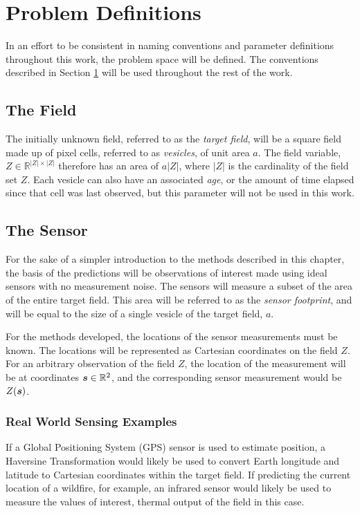 \chapter{Problem Definitions} \label{ch:defs}
In an effort to be consistent in naming conventions and parameter definitions throughout this work, the problem space will be defined. The conventions described in Section \ref{ch:defs} will be used throughout the rest of the work.

\section{The Field}
The initially unknown field, referred to as the \textit{target field}, will be a square field made up of pixel cells, referred to as \textit{vesicles}, of unit area $a$. The field variable, $Z \in \mathbb{R}^{|Z| \times |Z|}$ therefore has an area of $a|Z|$, where $|Z|$ is the cardinality of the field set $Z$. Each vesicle can also have an associated \textit{age}, or the amount of time elapsed since that cell was last observed, but this parameter will not be used in this work.

\section{The Sensor}
For the sake of a simpler introduction to the methods described in this chapter, the basis of the predictions will be observations of interest made using ideal sensors with no measurement noise. The sensors will measure a subset of the area of the entire target field. This area will be referred to as the \textit{sensor footprint}, and will be equal to the size of a single vesicle of the target field, $a$.

For the methods developed, the locations of the sensor measurements must be known. The locations will be represented as Cartesian coordinates on the field $Z$. For an arbitrary observation of the field $Z$, the location of the measurement will be at coordinates ${\it{\boldsymbol{s}}} \in \mathbb{R}^2$, and the corresponding sensor measurement would be $Z({\it{\boldsymbol{s}}})$. 

\subsection{Real World Sensing Examples}
If a Global Positioning System (GPS) sensor is used to estimate position, a Haversine Transformation would likely be used to convert Earth longitude and latitude to Cartesian coordinates within the target field. If predicting the current location of a wildfire, for example, an infrared sensor would likely be used to measure the values of interest, thermal output of the field in this case.


